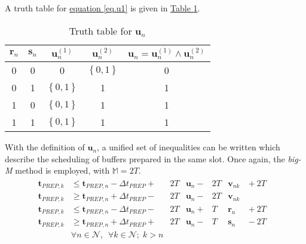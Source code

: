 A truth table for \hyperref[eq.u1]{equation \ref*{eq.u1}} is given in 
\hyperref[tbl.truthu]{Table \ref*{tbl.truthu}}.
\begin{table}[h!]
    \centering
    \caption{Truth table for $\boldsymbol{u}_{n}$}
    \label{tbl.truthu}
    \begin{tabular}{c c | c c | c}
        $\boldsymbol{r}_{n}$ & $\boldsymbol{s}_{n}$ &
        $\boldsymbol{u}_{n}^{\left( 1 \right)}$ &
        $\boldsymbol{u}_{n}^{\left( 2 \right)}$ &
        $\boldsymbol{u}_{n} = \boldsymbol{u}_{n}^{\left( 1 \right)}
            \land \boldsymbol{u}_{n}^{\left( 2 \right)}
        $\\ \hline
        0 & 0 & 0 & $\left\{ 0,1 \right\}$ & 0\\
        0 & 1 & $\left\{ 0,1 \right\}$ & 1 & 1\\
        1 & 0 & $\left\{ 0,1 \right\}$ & 1 & 1\\
        1 & 1 & $\left\{ 0,1 \right\}$ & 1 & 1\\
    \end{tabular}
\end{table}
With the definition of $\boldsymbol{u}_{n}$, a unified set of inequalities can
be written which describe the scheduling of buffers prepared in the same slot.
Once again, the \emph{big-M} method is employed, with $\mathbb{M} = 2T$.
\begin{equation}
    \begin{split}
        \begin{alignedat}{10}
            \boldsymbol{t}_{\mathit{PREP},k}
            &\le \boldsymbol{t}_{\mathit{PREP},n}
            - \Delta t_{\mathit{PREP}} {}+{} & 2T &\boldsymbol{u}_{n}
            {}-{} & 2T &\boldsymbol{v}_{nk} & {}+{} 2T&\\
            \boldsymbol{t}_{\mathit{PREP},k}
            &\ge \boldsymbol{t}_{\mathit{PREP},n}
            + \Delta t_{\mathit{PREP}} {}-{} & 2T &\boldsymbol{u}_{n}
            {}-{} & 2T &\boldsymbol{v}_{nk}&\\
            \boldsymbol{t}_{\mathit{PREP},k}
            &\le \boldsymbol{t}_{\mathit{PREP},n}
            - \Delta t_{\mathit{PREP}} {}-{} & 2T &\boldsymbol{u}_{n}
            {}+{} & T &\boldsymbol{r}_{n} & {}+{} 2T&\\
            \boldsymbol{t}_{\mathit{PREP},k}
            &\ge \boldsymbol{t}_{\mathit{PREP},n}
            + \Delta t_{\mathit{PREP}} {}+{} & 2T &\boldsymbol{u}_{n}
            {}-{} & T &\boldsymbol{s}_{n} & {}-{} 2T&\\
            &\forall n \in \mathcal{N}, \enspace \forall k \in \mathcal{N}; \;
            k > n
            \end{alignedat}            
    \end{split}
    \label{eq.k4}
\end{equation}

